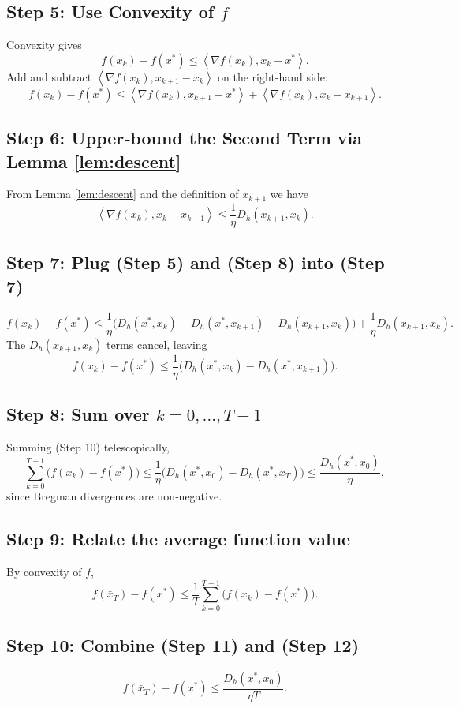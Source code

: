 \documentclass{article}
\newcommand{\ip}[2]{\left\langle #1,#2\right\rangle}
\newcommand{\D}[2]{D_h(#1,#2)}
\newcommand{\grad}[1]{\nabla #1}
\begin{document}
\subsection*{Step 5: Use Convexity of $f$}
Convexity gives
\[
f(x_{k})-f(x^*)\le \ip{\grad{f}(x_k)}{x_k-x^*}.
\tag{Step 6}
\]
Add and subtract $\ip{\grad{f}(x_k)}{x_{k+1}-x_k}$ on the right‑hand side:
\[
f(x_k)-f(x^*)\le \ip{\grad{f}(x_k)}{x_{k+1}-x^*}
+ \ip{\grad{f}(x_k)}{x_k-x_{k+1}}.
\tag{Step 7}
\]

\subsection*{Step 6: Upper‑bound the Second Term via Lemma \ref{lem:descent}}
From Lemma \ref{lem:descent} and the definition of $x_{k+1}$ we have
\[
\ip{\grad{f}(x_k)}{x_k-x_{k+1}}
\le \frac1\eta\D{x_{k+1}}{x_k}.
\tag{Step 8}
\]

\subsection*{Step 7: Plug (Step 5) and (Step 8) into (Step 7)}
\[
f(x_k)-f(x^*)\le 
\frac1\eta\Big(\D{x^*}{x_k}-\D{x^*}{x_{k+1}}-\D{x_{k+1}}{x_k}\Big)
+\frac1\eta\D{x_{k+1}}{x_k}.
\tag{Step 9}
\]
The $\D{x_{k+1}}{x_k}$ terms cancel, leaving
\[
f(x_k)-f(x^*)\le \frac1\eta\Big(\D{x^*}{x_k}-\D{x^*}{x_{k+1}}\Big).
\tag{Step 10}
\]

\subsection*{Step 8: Sum over $k=0,\dots,T-1$}
Summing (Step 10) telescopically,
\[
\sum_{k=0}^{T-1}\bigl(f(x_k)-f(x^*)\bigr)
\le \frac1\eta\Big(\D{x^*}{x_0}-\D{x^*}{x_T}\Big)
\le \frac{\D{x^*}{x_0}}{\eta},
\tag{Step 11}
\]
since Bregman divergences are non‑negative.

\subsection*{Step 9: Relate the average function value}
By convexity of $f$,
\[
f(\bar{x}_T)-f(x^*)\le\frac1T\sum_{k=0}^{T-1}\bigl(f(x_k)-f(x^*)\bigr).
\tag{Step 12}
\]

\subsection*{Step 10: Combine (Step 11) and (Step 12)}
\[
f(\bar{x}_T)-f(x^*)\le
\frac{\D{x^*}{x_0}}{\eta T}.
\tag{Step 13}
\]
\end{document}
